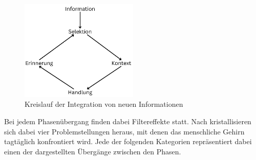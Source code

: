 \begin{figure}[h!]
	\centering
	\includegraphics[width=0.5\textwidth]{resources/informationskreislauf.jpg}
	\caption{Kreislauf der Integration von neuen Informationen}
	\label{fig:informationskreislauf}
\end{figure}

Bei jedem Phasenübergang finden dabei Filtereffekte statt.
Nach \cite{benson2016cognitive} kristallisieren sich dabei vier Problemstellungen heraus, mit denen das menschliche Gehirn tagtäglich konfrontiert wird.
Jede der folgenden Kategorien repräsentiert dabei einen der dargestellten Übergänge zwischen den Phasen.

